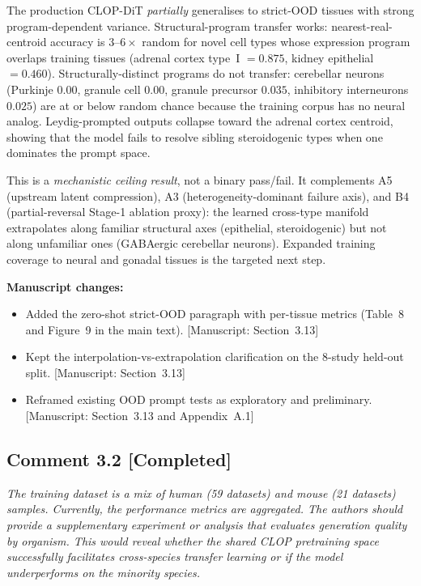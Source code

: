 \documentclass[11pt,letterpaper]{article}
\newcommand{\statuscompleted}{\textcolor{statusgreen}{\textbf{[Completed]}}}
\newcommand{\msref}[1]{\textcolor{blue!60!black}{\textsf{[Manuscript: #1]}}}
\begin{document}
\begin{revisionupdate}
The production CLOP-DiT \emph{partially} generalises to strict-OOD tissues with strong program-dependent variance. Structural-program transfer works: nearest-real-centroid accuracy is $3$--$6\times$ random for novel cell types whose expression program overlaps training tissues (adrenal cortex type~I $= 0.875$, kidney epithelial $= 0.460$). Structurally-distinct programs do not transfer: cerebellar neurons (Purkinje $0.00$, granule cell $0.00$, granule precursor $0.035$, inhibitory interneurons $0.025$) are at or below random chance because the training corpus has no neural analog. Leydig-prompted outputs collapse toward the adrenal cortex centroid, showing that the model fails to resolve sibling steroidogenic types when one dominates the prompt space.

This is a \emph{mechanistic ceiling result}, not a binary pass/fail. It complements A5 (upstream latent compression), A3 (heterogeneity-dominant failure axis), and B4 (partial-reversal Stage-1 ablation proxy): the learned cross-type manifold extrapolates along familiar structural axes (epithelial, steroidogenic) but not along unfamiliar ones (GABAergic cerebellar neurons). Expanded training coverage to neural and gonadal tissues is the targeted next step.
\end{revisionupdate}

\noindent\textbf{Manuscript changes:}
\begin{itemize}
  \item Added the zero-shot strict-OOD paragraph with per-tissue metrics (Table~8 and Figure~9 in the main text). \msref{Section~3.13}
  \item Kept the interpolation-vs-extrapolation clarification on the 8-study held-out split. \msref{Section~3.13}
  \item Reframed existing OOD prompt tests as exploratory and preliminary. \msref{Section~3.13 and Appendix~A.1}
\end{itemize}

\medskip

\subsection*{Comment 3.2 \hfill \statuscompleted}

\begin{reviewercomment}
\itshape
The training dataset is a mix of human (59 datasets) and mouse (21 datasets) samples. Currently, the performance metrics are aggregated. The authors should provide a supplementary experiment or analysis that evaluates generation quality by organism. This would reveal whether the shared CLOP pretraining space successfully facilitates cross-species transfer learning or if the model underperforms on the minority species.
\end{reviewercomment}
\end{document}
